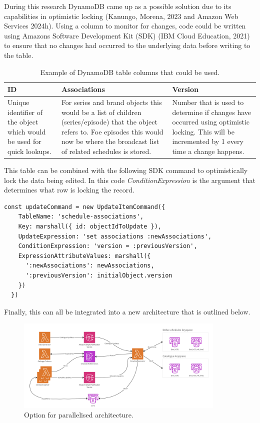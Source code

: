 During this research DynamoDB came up as a possible solution due to its capabilities in optimistic locking 
(Kanungo, Morena, 2023 and Amazon Web Services 2024h). Using a column to monitor for changes, code could be written using Amazons Software Development
Kit (SDK) (IBM Cloud Education, 2021) to ensure that no changes had occurred to the underlying data before writing to the table. 

\begin{table}[H]
  \centering
  \begin{tabular}{|p{}|p{}|p{}|}
    \hline
    ID & Associations & Version \\ \hline
    Unique identifier of the object which would be used for quick lookups. 
    & For series and brand objects this would be a list of children (series/episode) that the object refers to. Foe episodes this would now be 
    where the broadcast list of related schedules is stored.
    & Number that is used to determine if changes have occurred using optimistic locking. This will be incremented by 1 every time a change happens. \\ \hline
  \end{tabular}
  \caption{Example of DynamoDB table columns that could be used.}
\end{table}

This table can be combined with the following SDK command to optimistically lock the data being edited. In this code \emph{ConditionExpression} is 
the argument that determines what row is locking the record.

\begin{lstlisting}[caption=SDK command sent to optimistically lock writes to the association's column.]
  const updateCommand = new UpdateItemCommand({
    TableName: 'schedule-associations',
    Key: marshall({ id: objectIdToUpdate }),
    UpdateExpression: 'set associations :newAssociations',
    ConditionExpression: 'version = :previousVersion',
    ExpressionAttributeValues: marshall({ 
      ':newAssociations': newAssociations,
      ':previousVersion': initialObject.version 
    })
  })
  \end{lstlisting}

  Finally, this can all be integrated into a new architecture that is outlined below.

  \begin{figure}[H]
    \centering
    \includegraphics[width=10cm]{assets/architectures/dynamo.png}
    \caption{Option for parallelised architecture.}
    \label{fig:dynamoArchitecture}
  \end{figure}

